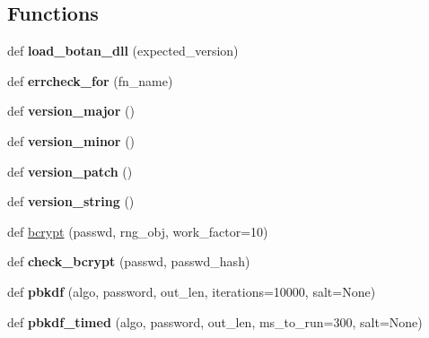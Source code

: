 \subsection*{Functions}
\begin{DoxyCompactItemize}
\item 
\mbox{\label{namespacebotan2_ace6a00cda1723b250f6952e85b4c0cb5}} 
def {\bfseries load\+\_\+botan\+\_\+dll} (expected\+\_\+version)
\item 
\mbox{\label{namespacebotan2_ab0d08045bbc24e2d1437c9f81644598e}} 
def {\bfseries errcheck\+\_\+for} (fn\+\_\+name)
\item 
\mbox{\label{namespacebotan2_a990672a328076776faa8754863d3226b}} 
def {\bfseries version\+\_\+major} ()
\item 
\mbox{\label{namespacebotan2_ae41ae6a6384300b070ed328c3eea3d86}} 
def {\bfseries version\+\_\+minor} ()
\item 
\mbox{\label{namespacebotan2_a5925726f12772187d9c647bf42045818}} 
def {\bfseries version\+\_\+patch} ()
\item 
\mbox{\label{namespacebotan2_a39de77f838adc7c42488a5ec103c9afd}} 
def {\bfseries version\+\_\+string} ()
\item 
def \mbox{\hyperlink{namespacebotan2_a4007ddd20b2518c25853bc23fcd57b2c}{bcrypt}} (passwd, rng\+\_\+obj, work\+\_\+factor=10)
\item 
\mbox{\label{namespacebotan2_a8d3665799ddefeb41af2b7306cdf3ff5}} 
def {\bfseries check\+\_\+bcrypt} (passwd, passwd\+\_\+hash)
\item 
\mbox{\label{namespacebotan2_a5fa159dd99655cf6caf82c103193af29}} 
def {\bfseries pbkdf} (algo, password, out\+\_\+len, iterations=10000, salt=None)
\item 
\mbox{\label{namespacebotan2_af3c0ad9946f21e1950864d2b0f7ee099}} 
def {\bfseries pbkdf\+\_\+timed} (algo, password, out\+\_\+len, ms\+\_\+to\+\_\+run=300, salt=None)
\item 
\mbox{\label{namespacebotan2_af63c31aaebc337dc0a13042ce4a97519}} 

\end{DoxyCompactItemize}
